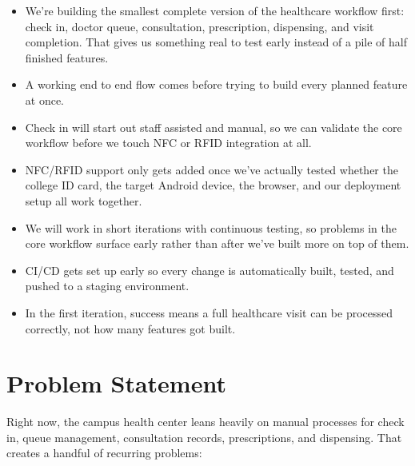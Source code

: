 \documentclass[11pt,a4paper]{article}
\begin{document}
\begin{itemize}
    \item We're building the smallest complete version of the healthcare workflow first: check in, doctor queue, consultation, prescription, dispensing, and visit completion. That gives us something real to test early instead of a pile of half finished features.
    \item A working end to end flow comes before trying to build every planned feature at once.
    \item Check in will start out staff assisted and manual, so we can validate the core workflow before we touch NFC or RFID integration at all.
    \item NFC/RFID support only gets added once we've actually tested whether the college ID card, the target Android device, the browser, and our deployment setup all work together.
    \item We will work in short iterations with continuous testing, so problems in the core workflow surface early rather than after we've built more on top of them.
    \item CI/CD gets set up early so every change is automatically built, tested, and pushed to a staging environment.
    \item In the first iteration, success means a full healthcare visit can be processed correctly, not how many features got built.
\end{itemize}


\section{Problem Statement}

Right now, the campus health center leans heavily on manual processes for check in, queue management, consultation records, prescriptions, and dispensing. That creates a handful of recurring problems:
\end{document}
